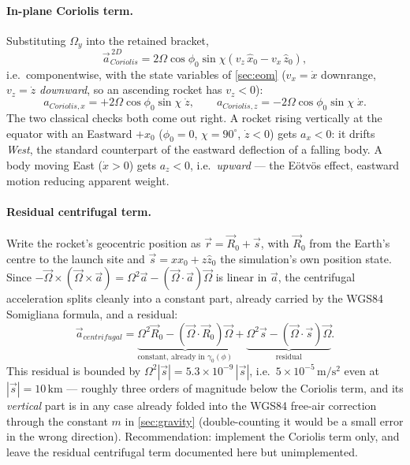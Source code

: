 \paragraph{In-plane Coriolis term.} Substituting $\Omega_y$ into the retained bracket,
\begin{equation} \label{eq:coriolis_2d}
    \vec{a}_{Coriolis}^{\,2D} = 2\Omega\cos\phi_0\sin\chi\left(v_z\,\hat{x}_0 - v_x\,\hat{z}_0\right),
\end{equation}
i.e.\ componentwise, with the state variables of \autoref{sec:eom} ($v_x=\dot{x}$ downrange,
$v_z=\dot{z}$ \emph{downward}, so an ascending rocket has $v_z<0$):
\begin{equation}
    a_{Coriolis,x} = +2\Omega\cos\phi_0\sin\chi\;\dot{z}, \qquad
    a_{Coriolis,z} = -2\Omega\cos\phi_0\sin\chi\;\dot{x}.
\end{equation}
The two classical checks both come out right. A rocket rising vertically at the equator with an
Eastward $+\hat{x}_0$ ($\phi_0=0$, $\chi=90^\circ$, $\dot{z}<0$) gets $a_x<0$: it drifts
\emph{West}, the standard counterpart of the eastward deflection of a falling body. A body moving
East ($\dot{x}>0$) gets $a_z<0$, i.e.\ \emph{upward} --- the E\"otv\"os effect, eastward motion
reducing apparent weight.

\paragraph{Residual centrifugal term.} Write the rocket's geocentric position as
$\vec{r}=\vec{R}_0+\vec{s}$, with $\vec{R}_0$ from the Earth's centre to the launch site and
$\vec{s}=x\hat{x}_0+z\hat{z}_0$ the simulation's own position state. Since
$-\vec{\Omega}\times(\vec{\Omega}\times\vec{a})=\Omega^2\vec{a}-(\vec{\Omega}\cdot\vec{a})
\vec{\Omega}$ is linear in $\vec{a}$, the centrifugal acceleration splits cleanly into a constant
part, already carried by the WGS84 Somigliana formula, and a residual:
\begin{equation}
    \vec{a}_{centrifugal} = \underbrace{\Omega^2\vec{R}_0-(\vec{\Omega}\cdot\vec{R}_0)\vec{\Omega}}
        _{\text{constant, already in }\gamma_0(\phi)}
        + \underbrace{\Omega^2\vec{s}-(\vec{\Omega}\cdot\vec{s})\vec{\Omega}}_{\text{residual}}.
\end{equation}
This residual is bounded by $\Omega^2|\vec{s}|=5.3\times10^{-9}\,|\vec{s}|$, i.e.\
$5\times10^{-5}\,\mathrm{m/s^2}$ even at $|\vec{s}|=10\,\mathrm{km}$ --- roughly three orders of
magnitude below the Coriolis term, and its \emph{vertical} part is in any case already folded into
the WGS84 free-air correction through the constant $m$ in \autoref{sec:gravity} (double-counting it
would be a small error in the wrong direction). Recommendation: implement the Coriolis term only,
and leave the residual centrifugal term documented here but unimplemented.

